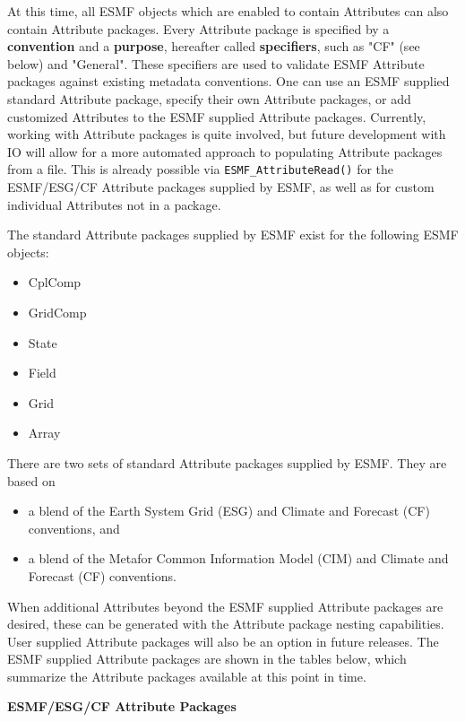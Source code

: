 At this time, all ESMF objects which are enabled to contain Attributes can also contain Attribute packages.  Every Attribute package is specified by a {\bf convention} and a {\bf purpose}, hereafter called {\bf specifiers}, such as "CF" (see below) and "General".  These specifiers are used to validate ESMF Attribute packages against existing metadata conventions.  One can use an ESMF supplied standard Attribute package, specify their own Attribute packages, or add customized Attributes to the ESMF supplied Attribute packages.  Currently, working with Attribute packages is quite involved, but future development with IO will allow for a more automated approach to populating Attribute packages from a file.  This is already possible via {\tt ESMF\_AttributeRead()} for the ESMF/ESG/CF Attribute packages supplied by ESMF, as well as for custom individual Attributes not in a package.

The standard Attribute packages supplied by ESMF exist for the following ESMF objects:

\begin{itemize}
\item CplComp
\item GridComp
\item State
\item Field
\item Grid
\item Array
\end{itemize}

There are two sets of standard Attribute packages supplied by ESMF.  They are based on 

\begin{itemize}
\item a blend of the Earth System Grid (ESG) and Climate and Forecast (CF) conventions, and
\item a blend of the Metafor Common Information Model (CIM) and Climate and Forecast (CF) conventions.
\end{itemize}

When additional Attributes beyond the ESMF supplied Attribute packages are desired, these can be generated with the Attribute package nesting capabilities.  User supplied Attribute packages will also be an option in future releases.  The ESMF supplied Attribute packages are shown in the tables below, which summarize the Attribute packages available at this point in time.

\vspace{8pt}
{\bf \large ESMF/ESG/CF Attribute Packages}

